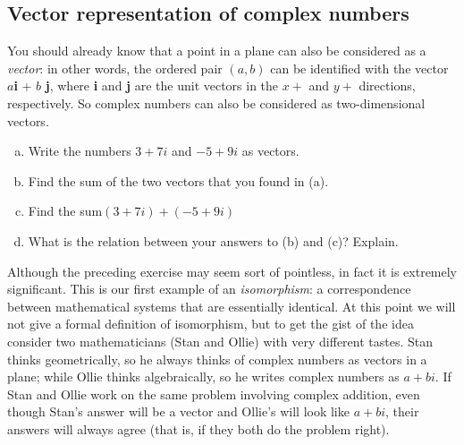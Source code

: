 \subsection{Vector representation of complex numbers}

You should already know that a point in a plane can also be considered as a \emph{vector}: in other words, the ordered pair $(a,b)$ can be identified with the vector $a$\textbf{i} + $b$ \textbf{j}, where \textbf{i} and \textbf{j} are the unit vectors in the $x+$ and $y+$ directions, respectively. So complex numbers can also be considered as two-dimensional vectors. 

\begin{exercise}{19} 
\begin{enumerate}[(a)]
\item
Write the numbers $3 + 7i$  and $-5 + 9i$ as  vectors.
\item
Find the sum of the two vectors that you found in (a).
\item
 Find the sum$(3 + 7i) + (-5 + 9i)$
\item
What is the relation between your answers to (b) and (c)? Explain.
\end{enumerate}
\end{exercise}

Although the preceding exercise may seem sort of pointless, in fact it is extremely significant. This is our first example of an \emph{isomorphism}: a correspondence between mathematical systems that are essentially identical. At this point we will not give a formal definition of isomorphism, but 
to get the gist of the idea consider two mathematicians (Stan and Ollie) with very different tastes. Stan thinks geometrically, so he always thinks of complex numbers as vectors in a plane; while Ollie thinks algebraically, so he writes complex numbers as $a + bi$. If Stan and Ollie work on the same problem involving complex addition, even though Stan's answer will be a vector and Ollie's will look like $a + bi$, their answers will always agree (that is, if they both do the problem right).

